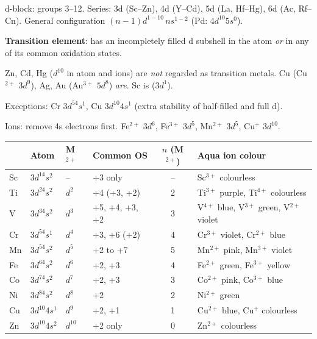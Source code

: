 \documentclass[9pt,a4paper]{extarticle}
\begin{document}
\begin{multicols}{2}\raggedcolumns
\begin{fl}
\item d-block: groups 3--12. Series: 3d (Sc--Zn), 4d (Y--Cd), 5d (La, Hf--Hg), 6d (Ac, Rf--Cn). General configuration $(n-1)d^{1-10}\,ns^{1-2}$ (Pd: $4d^{10}5s^0$).
\item \textbf{Transition element}: has an incompletely filled d subshell in the atom \emph{or} in any of its common oxidation states.
\item Zn, Cd, Hg ($d^{10}$ in atom and ions) are \emph{not} regarded as transition metals. Cu (Cu$^{2+}$ $3d^9$), Ag, Au (Au$^{3+}$ $5d^8$) \emph{are}. Sc is ($3d^1$).
\item Exceptions: Cr $3d^54s^1$, Cu $3d^{10}4s^1$ (extra stability of half-filled and full d).
\item Ions: remove 4s electrons first. Fe$^{2+}$ $3d^6$, Fe$^{3+}$ $3d^5$, Mn$^{2+}$ $3d^5$, Cu$^+$ $3d^{10}$.
\end{fl}
{\scriptsize\setlength{\tabcolsep}{2.2pt}
\begin{tabularx}{\linewidth}{@{}l l l Y c Y@{}}
\toprule
 & \textbf{Atom} & \textbf{M$^{2+}$} & \textbf{Common OS} & \textbf{$n$ (M$^{2+}$)} & \textbf{Aqua ion colour}\\
\midrule
Sc & $3d^14s^2$ & -- & +3 only & -- & Sc$^{3+}$ colourless\\
Ti & $3d^24s^2$ & $d^2$ & +4 (+3, +2) & 2 & Ti$^{3+}$ purple, Ti$^{4+}$ colourless\\
V & $3d^34s^2$ & $d^3$ & +5, +4, +3, +2 & 3 & V$^{4+}$ blue, V$^{3+}$ green, V$^{2+}$ violet\\
Cr & $3d^54s^1$ & $d^4$ & +3, +6 (+2) & 4 & Cr$^{3+}$ violet, Cr$^{2+}$ blue\\
Mn & $3d^54s^2$ & $d^5$ & +2 to +7 & 5 & Mn$^{2+}$ pink, Mn$^{3+}$ violet\\
Fe & $3d^64s^2$ & $d^6$ & +2, +3 & 4 & Fe$^{2+}$ green, Fe$^{3+}$ yellow\\
Co & $3d^74s^2$ & $d^7$ & +2, +3 & 3 & Co$^{2+}$ pink, Co$^{3+}$ blue\\
Ni & $3d^84s^2$ & $d^8$ & +2 & 2 & Ni$^{2+}$ green\\
Cu & $3d^{10}4s^1$ & $d^9$ & +2, +1 & 1 & Cu$^{2+}$ blue, Cu$^+$ colourless\\
Zn & $3d^{10}4s^2$ & $d^{10}$ & +2 only & 0 & Zn$^{2+}$ colourless\\
\bottomrule
\end{tabularx}\par}


\end{multicols}
\end{document}
